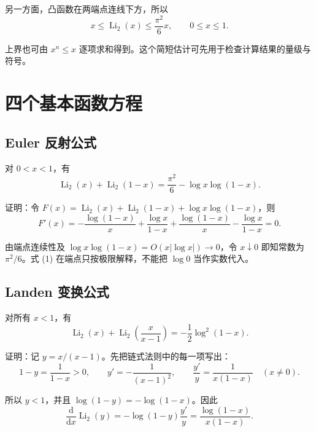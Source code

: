 \documentclass[11pt,a4paper]{article}
\begin{document}
另一方面，凸函数在两端点连线下方，所以
\[
x\leqslant\operatorname{Li}_2(x)\leqslant\frac{\pi^2}{6}x,
\qquad 0\leqslant x\leqslant1.
\]

上界也可由 \(x^n\leqslant x\)
逐项求和得到。这个简短估计可先用于检查计算结果的量级与符号。

\hypertarget{ux56dbux4e2aux57faux672cux51fdux6570ux65b9ux7a0b}{%
\section{四个基本函数方程}\label{ux56dbux4e2aux57faux672cux51fdux6570ux65b9ux7a0b}}

\hypertarget{euler-ux53cdux5c04ux516cux5f0f}{%
\subsection{Euler 反射公式}\label{euler-ux53cdux5c04ux516cux5f0f}}

对 \(0<x<1\)，有
\begin{equation}
\operatorname{Li}_2(x)+\operatorname{Li}_2(1-x)
=\frac{\pi^2}{6}-\log x\log(1-x).
\tag{1}
\end{equation}

证明：令
\(F(x)=\operatorname{Li}_2(x)+\operatorname{Li}_2(1-x)+\log x\log(1-x)\)，则
\[
F'(x)=-\frac{\log(1-x)}x+\frac{\log x}{1-x}
+\frac{\log(1-x)}x-\frac{\log x}{1-x}=0.
\]

由端点连续性及 \(\log x\log(1-x)=O(x|\log x|)\to0\)，令 \(x\downarrow0\)
即知常数为 \(\pi^2/6\)。式 (1) 在端点只按极限解释，不能把 \(\log0\)
当作实数代入。

\hypertarget{landen-ux53d8ux6362ux516cux5f0f}{%
\subsection{Landen 变换公式}\label{landen-ux53d8ux6362ux516cux5f0f}}

对所有 \(x<1\)，有
\begin{equation}
\operatorname{Li}_2(x)+\operatorname{Li}_2\!\left(\frac{x}{x-1}\right)
=-\frac12\log^2(1-x).
\tag{2}
\end{equation}

证明：记 \(y=x/(x-1)\)。先把链式法则中的每一项写出：
\[
1-y=\frac1{1-x}>0,\qquad
y'=-\frac1{(x-1)^2},\qquad
\frac{y'}y=\frac1{x(1-x)}\quad(x\ne0).
\]

所以 \(y<1\)，并且 \(\log(1-y)=-\log(1-x)\)。因此
\[
\frac{\mathrm d}{\mathrm dx}\operatorname{Li}_2(y)
=-\log(1-y)\frac{y'}y
=\frac{\log(1-x)}{x(1-x)}.
\]
\end{document}
